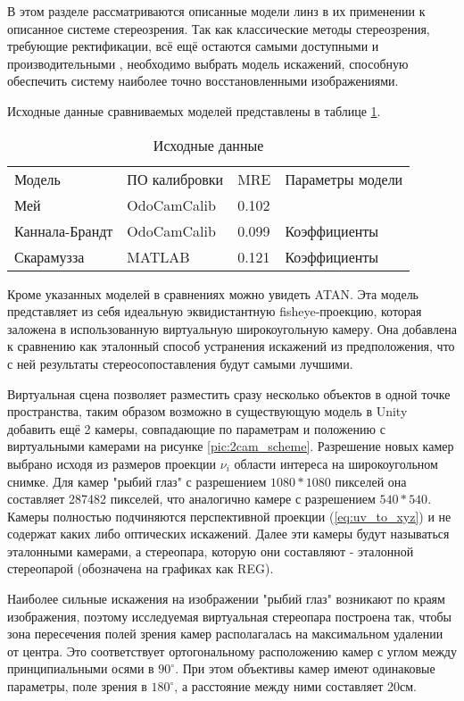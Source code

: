 
В этом разделе рассматриваются описанные модели линз в их применении к описанное системе стереозрения. 
Так как классические методы стереозрения, требующие ректификации, всё ещё остаются самыми доступными и производительными \cite{disparity_review}, 
необходимо выбрать модель искажений, способную обеспечить систему наиболее точно восстановленными изображениями. 

Исходные данные сравниваемых моделей представлены в таблице \ref{tab:models_params}.

\begin{table}[]
    \centering
    \caption{Исходные данные}
    \label{tab:models_params}
    \begin{tabular}{llll}
    Модель         & ПО калибровки & MRE   & Параметры модели \\
    Мей            & OdoCamCalib   & 0.102 &                  \\
    Каннала-Брандт & OdoCamCalib   & 0.099 & Коэффициенты     \\
    Скарамузза     & MATLAB        & 0.121 & Коэффициенты    
    \end{tabular}
\end{table}

Кроме указанных моделей в сравнениях можно увидеть ATAN. Эта модель представляет из себя идеальную эквидистантную fisheye-проекцию, 
которая заложена в использованную виртуальную широкоугольную камеру. 
Она добавлена к сравнению как эталонный способ устранения искажений из предположения, что с ней результаты стереосопоставления будут 
самыми лучшими.  

Виртуальная сцена позволяет разместить сразу несколько объектов в одной точке пространства, таким образом возможно
в существующую модель в Unity добавить ещё 2 камеры, совпадающие по параметрам и положению с виртуальными камерами на 
рисунке \ref{pic:2cam_scheme}. Разрешение новых камер выбрано исходя из размеров проекции $\nu_i$ области интереса на широкоугольном
снимке. Для камер "рыбий глаз" с разрешением $1080*1080$ пикселей она составляет 287482 пикселей, что аналогично камере 
с разрешением $540*540$. Камеры полностью подчиняются перспективной проекции (\ref{eq:uv_to_xyz}) и не содержат каких либо оптических искажений.
 Далее эти камеры будут называться эталонными камерами, а стереопара, которую они составляют - эталонной стереопарой (обозначена на графиках как REG).

Наиболее сильные искажения на изображении "рыбий глаз" возникают по краям изображения, поэтому исследуемая виртуальная стереопара построена так,
чтобы зона пересечения полей зрения камер располагалась на максимальном удалении от центра. Это соответствует ортогональному расположению
камер с углом между принципиальными осями в $90^\circ$.  При этом объективы камер имеют одинаковые параметры, поле зрения в $180^\circ$,
 а расстояние между ними составляет 20см. %

